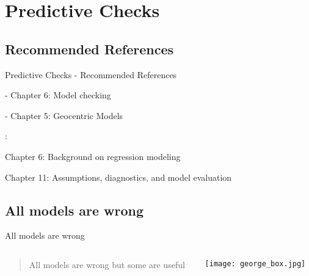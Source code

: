 \section{Predictive Checks}

\subsection{Recommended References}
\begin{frame}{Predictive Checks - Recommended References}
	\begin{vfilleditems}
		\item \textcite{gelman2013bayesian} - Chapter 6: Model checking
		\item \textcite{mcelreath2020statistical} - Chapter 5: Geocentric Models
		\item \textcite{gelman2020regression}:
		\begin{vfilleditems}
			\item Chapter 6: Background on regression modeling
			\item Chapter 11: Assumptions, diagnostics, and model evaluation
		\end{vfilleditems}
		\item \textcite{gelmanBayesianWorkflow2020}
	\end{vfilleditems}
\end{frame}

\subsection{All models are wrong}
\begin{frame}{All models are wrong}
	\begin{columns}
		\begin{column}{0.8\textwidth}
			\begin{quotation}
				All models are wrong but some are useful
			\end{quotation}
			\vfill
			\textcite{boxScienceStatistics1976}
		\end{column}
		\begin{column}{0.2\textwidth}
			\texttt{[image: george\_box.jpg]}
		\end{column}
	\end{columns}
\end{frame}

